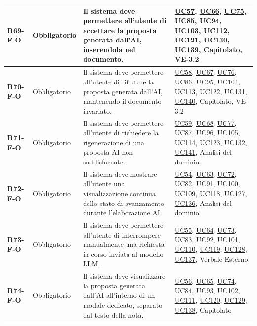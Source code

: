 \begin{longtable}{|p{2.5cm}|p{2.2cm}|p{6.8cm}|p{2.7cm}|}
	\textbf{R69-F-O} & Obbligatorio & Il sistema deve permettere all'utente di accettare la proposta generata dall'AI, inserendola nel documento. & \hyperlink{uc57}{UC57}, \hyperlink{uc66}{UC66}, \hyperlink{uc75}{UC75}, \hyperlink{uc85}{UC85}, \hyperlink{uc94}{UC94}, \hyperlink{uc103}{UC103}, \hyperlink{uc112}{UC112}, \hyperlink{uc121}{UC121}, \hyperlink{uc130}{UC130}, \hyperlink{uc139}{UC139}, Capitolato, VE-3.2 \\ \hline
	\textbf{R70-F-O} & Obbligatorio & Il sistema deve permettere all'utente di rifiutare la proposta generata dall'AI, mantenendo il documento invariato. & \hyperlink{uc58}{UC58}, \hyperlink{uc67}{UC67}, \hyperlink{uc76}{UC76}, \hyperlink{uc86}{UC86}, \hyperlink{uc95}{UC95}, \hyperlink{uc104}{UC104}, \hyperlink{uc113}{UC113}, \hyperlink{uc122}{UC122}, \hyperlink{uc131}{UC131}, \hyperlink{uc140}{UC140}, Capitolato, VE-3.2 \\ \hline
	\textbf{R71-F-O} & Obbligatorio & Il sistema deve permettere all'utente di richiedere la rigenerazione di una proposta AI non soddisfacente. & \hyperlink{uc59}{UC59}, \hyperlink{uc68}{UC68}, \hyperlink{uc77}{UC77}, \hyperlink{uc87}{UC87}, \hyperlink{uc96}{UC96}, \hyperlink{uc105}{UC105}, \hyperlink{uc114}{UC114}, \hyperlink{uc123}{UC123}, \hyperlink{uc132}{UC132}, \hyperlink{uc141}{UC141}, Analisi del dominio \\ \hline

	\textbf{R72-F-O} & Obbligatorio & Il sistema deve mostrare all'utente una visualizzazione continua dello stato di avanzamento durante l'elaborazione AI. & \hyperlink{uc54}{UC54}, \hyperlink{uc63}{UC63}, \hyperlink{uc72}{UC72}, \hyperlink{uc82}{UC82}, \hyperlink{uc91}{UC91}, \hyperlink{uc100}{UC100}, \hyperlink{uc109}{UC109}, \hyperlink{uc118}{UC118}, \hyperlink{uc127}{UC127}, \hyperlink{uc136}{UC136}, Analisi del dominio \\ \hline
	\textbf{R73-F-O} & Obbligatorio & Il sistema deve permettere all'utente di interrompere manualmente una richiesta in corso inviata al modello LLM. & \hyperlink{uc55}{UC55}, \hyperlink{uc64}{UC64}, \hyperlink{uc73}{UC73}, \hyperlink{uc83}{UC83}, \hyperlink{uc92}{UC92}, \hyperlink{uc101}{UC101}, \hyperlink{uc110}{UC110}, \hyperlink{uc119}{UC119}, \hyperlink{uc128}{UC128}, \hyperlink{uc137}{UC137}, Verbale Esterno \\ \hline
	\textbf{R74-F-O} & Obbligatorio & Il sistema deve visualizzare la proposta generata dall'AI all'interno di un modale dedicato, separato dal testo della nota. & \hyperlink{uc56}{UC56}, \hyperlink{uc65}{UC65}, \hyperlink{uc74}{UC74}, \hyperlink{uc84}{UC84}, \hyperlink{uc93}{UC93}, \hyperlink{uc102}{UC102}, \hyperlink{uc111}{UC111}, \hyperlink{uc120}{UC120}, \hyperlink{uc129}{UC129}, \hyperlink{uc138}{UC138}, Capitolato \\ \hline


\end{longtable}
